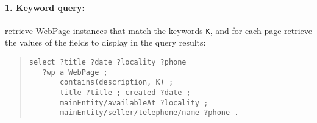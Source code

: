\paragraph{1. Keyword query:} retrieve WebPage instances that match the keywords \verb|K|, and for each page retrieve the values of the fields to display in the query results:
\begin{quote}
{\footnotesize
\begin{verbatim}
select ?title ?date ?locality ?phone
   ?wp a WebPage ; 
       contains(description, K) ;   
       title ?title ; created ?date ;
       mainEntity/availableAt ?locality ;
       mainEntity/seller/telephone/name ?phone .
\end{verbatim}}
\end{quote}
